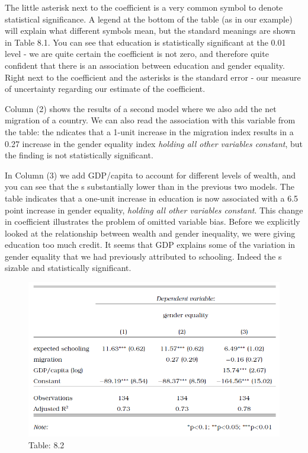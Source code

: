 \documentclass{book}
\begin{document}
The little asterisk next to the coefficient is a very common symbol to denote
statistical significance. A legend at the bottom of the table (as in our
example) will explain what different symbols mean, but the standard meanings
are shown in Table 8.1. You can see that education is statistically
significant at the 0.01 level - we are quite certain the coefficient is not
zero, and therefore quite confident that there is an association between
education and gender equality. Right next to the coefficient and the asterisks
is the standard error - our measure of uncertainty regarding our estimate of
the coefficient.

Column (2) shows the results of a second model where we also add the net
migration of a country. We can also read the association with this variable
from the table: the ndicates that a 1-unit increase in the migration index
results in a 0.27 increase in the gender equality index \emph{holding all
other variables constant}, but the finding is not statistically significant.

In Column (3) we add GDP/capita to account for different levels of wealth, and
you can see that the s substantially lower than in the previous two models.
The table indicates that a one-unit increase in education is now associated
with a 6.5 point increase in gender equality, \emph{holding all other
variables constant}. This change in coefficient illustrates the problem of
omitted variable bias. Before we explicitly looked at the relationship between
wealth and gender inequality, we were giving education too much credit. It
seems that GDP explains some of the variation in gender equality that we had
previously attributed to schooling. Indeed the s sizable and statistically
significant.

\begin{figure}
\centering
\includegraphics{images/largen/table8.2.png}
\caption{Table: 8.2}
\end{figure}
\end{document}

